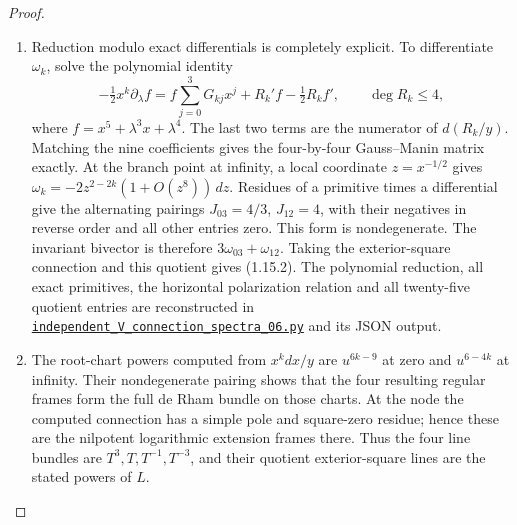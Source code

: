 \begin{proof}
\begin{enumerate}[label={$\langle1\rangle$\arabic*.}]
\item Reduction modulo exact differentials is completely explicit.  To
differentiate $\omega_k$, solve the polynomial identity
\[
-\tfrac12x^k\partial_\lambda f
 =f\sum_{j=0}^3G_{kj}x^j+R_k'f-\tfrac12R_kf',
 \qquad\deg R_k\leq4,
\]
where $f=x^5+\lambda^3x+\lambda^4$.  The last two terms are the
numerator of $d(R_k/y)$.  Matching the nine coefficients gives the
four-by-four Gauss--Manin matrix exactly.
At the branch point at infinity, a local coordinate $z=x^{-1/2}$
gives $\omega_k=-2z^{2-2k}(1+O(z^8))\,dz$.
Residues of a primitive times a differential give the alternating
pairings $J_{03}=4/3$, $J_{12}=4$, with their negatives in reverse
order and all other entries zero.  This form is nondegenerate.
The invariant bivector is therefore $3\omega_{03}+\omega_{12}$.
Taking the exterior-square connection and this quotient gives
(1.15.2). The polynomial reduction, all exact primitives, the horizontal
polarization relation and all twenty-five quotient entries are reconstructed
in \href{https://github.com/KokunoYumeto/s6-complex-structure-workbench/blob/83d76022bcd442278b760db9ff438afceed6c6ea/pro_returns/S6_SERIES_GRIND_checkpoint_10_20261120T0211Z/code/current_audits/audit_corrections/code/independent_V_connection_spectra_06.py}{\texttt{independent\_V\_connection\_spectra\_06.py}} and its JSON output.

\item The root-chart powers computed from $x^kdx/y$ are
$u^{6k-9}$ at zero and $u^{6-4k}$ at infinity.
Their nondegenerate pairing shows that the four resulting regular
frames form the full de Rham bundle on those charts.  At the node
the computed connection has a simple pole and square-zero residue;
hence these are the nilpotent logarithmic extension frames there.
Thus the four line bundles are
$T^3,T,T^{-1},T^{-3}$, and their quotient exterior-square lines are
the stated powers of $L$.


\end{enumerate}
\end{proof}
